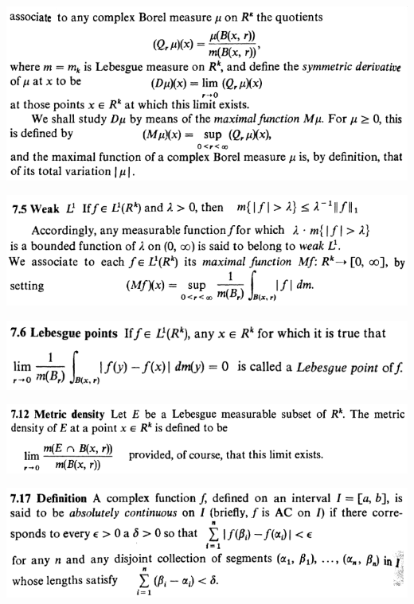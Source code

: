 \documentclass[12pt]{article}
\begin{document}
		\begin{center}
		\includegraphics{d7ponto2}
		\end{center}

		\begin{center}
		\includegraphics{d7ponto5}
		\end{center}

		\begin{center}
		\includegraphics{d7ponto6}
		\end{center}

		\begin{center}
		\includegraphics[scale=0.9]{d7ponto12}
		\end{center}

		\begin{center}
		\includegraphics{d7ponto17}
		\end{center}
\end{document}
